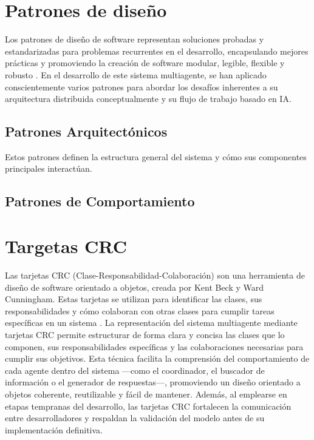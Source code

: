 \section{Patrones de diseño}
\label{sec:patrones_diseno}

Los patrones de diseño de software representan soluciones probadas y estandarizadas para problemas recurrentes en el desarrollo, encapsulando mejores prácticas y promoviendo la creación de software modular, legible, flexible y robusto \cite{gavilanez2022analisis}. En el desarrollo de este sistema multiagente, se han aplicado conscientemente varios patrones para abordar los desafíos inherentes a su arquitectura distribuida conceptualmente y su flujo de trabajo basado en IA.

\subsection{Patrones Arquitectónicos}
\label{subsec:patrones_arquitectonicos}

Estos patrones definen la estructura general del sistema y cómo sus componentes principales interactúan.

\subsection{Patrones de Comportamiento}


\section{Targetas CRC}

Las tarjetas CRC (Clase-Responsabilidad-Colaboración) son una herramienta de diseño de software orientado a objetos, creada por Kent Beck y Ward Cunningham. Estas tarjetas se utilizan para identificar las clases, sus responsabilidades y cómo colaboran con otras clases para cumplir tareas específicas en un sistema \cite{BeckCunningham}. La representación del sistema multiagente mediante tarjetas CRC permite estructurar de forma clara y concisa las clases que lo componen, sus responsabilidades específicas y las colaboraciones necesarias para cumplir sus objetivos. Esta técnica facilita la comprensión del comportamiento de cada agente dentro del sistema —como el coordinador, el buscador de información o el generador de respuestas—, promoviendo un diseño orientado a objetos coherente, reutilizable y fácil de mantener. Además, al emplearse en etapas tempranas del desarrollo, las tarjetas CRC fortalecen la comunicación entre desarrolladores y respaldan la validación del modelo antes de su implementación definitiva.

